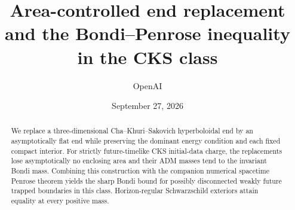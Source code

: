 \documentclass[11pt]{article}
\title{Area-controlled end replacement and the Bondi--Penrose inequality in the CKS class}
\author{OpenAI}
\date{September 27, 2026}
\numberwithin{equation}{section}
\theoremstyle{definition}
\theoremstyle{remark}
\begin{document}
\maketitle
\begin{abstract}
We replace a three-dimensional Cha--Khuri--Sakovich hyperboloidal end
by an asymptotically flat end while preserving the dominant energy
condition and each fixed compact interior. For strictly future-timelike
CKS initial-data charge, the replacements lose asymptotically no enclosing area
and their ADM masses tend to the invariant Bondi mass. Combining this
construction with the companion numerical spacetime Penrose theorem
yields the sharp Bondi bound for possibly disconnected weakly future
trapped boundaries in this class. Horizon-regular Schwarzschild
exteriors attain equality at every positive mass.
\end{abstract}
\tableofcontents








\end{document}
